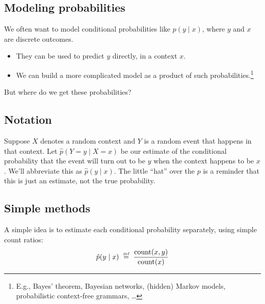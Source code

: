 \documentclass[11pt]{article}
\newcommand{\defeq}{\;\stackrel{\mbox{\tiny def}}{=}\;}
\newcommand{\ph}{\hat{p}}
\begin{document}
\subsection{Modeling probabilities}

We often want to model conditional probabilities like $p(y
\mid x)$, where $y$ and $x$ are discrete outcomes.
\begin{itemize}[noitemsep]
\item They can be used to predict $y$ directly, in a context $x$.
\item We can build a more complicated model as a product
  of such probabilities.\footnote{E.g., Bayes' theorem, Bayesian
    networks, (hidden) Markov models, probabilistic context-free
    grammars, \ldots}
\end{itemize}
But where do we get these probabilities?

\subsection{Notation}

Suppose $X$ denotes a random context and $Y$ is a random event that
happens in that context.  Let $\ph(Y=y \mid X=x)$ be our estimate of
the conditional probability that the event will turn out to be $y$ when
the context happens to be $x$.  We'll abbreviate this as
$\ph(y\mid x)$.  The little ``hat'' over the $p$ is a reminder that
this is just an estimate, not the true probability.

\subsection{Simple methods}\label{sec:mle}

A simple idea is to estimate each conditional probability separately,
using simple count ratios:
\begin{equation}
\ph(y \mid x) \defeq \frac{\textrm{count}(x,y)}{\textrm{count}(x)}
\end{equation}
\end{document}
